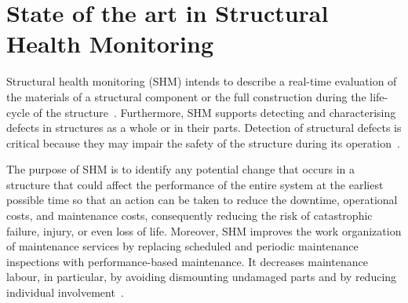 \chapter[State of the in for SHM]{State of the art in Structural Health Monitoring}
\label{ch2}
Structural health monitoring (SHM) intends to describe a real-time evaluation of the materials of a structural component or the full construction during the life-cycle of the structure~\cite{Balageas2010}. 
Furthermore, SHM supports detecting and characterising defects in structures as a whole or in their parts.
Detection of structural defects is critical because they may impair the safety of the structure during its operation~\cite{Yuan2016}. 

The purpose of SHM is to identify any potential change that occurs in a structure that could affect the performance of the entire system at the earliest possible time so that an action can be taken to reduce the downtime, operational costs, and maintenance costs, consequently reducing the risk of catastrophic failure, injury, or even loss of life.
Moreover, SHM improves the work organization of maintenance services by replacing scheduled and periodic maintenance inspections with performance-based maintenance.
It decreases maintenance labour, in particular, by avoiding dismounting undamaged parts and by reducing individual involvement~\cite{Balageas2010}.

